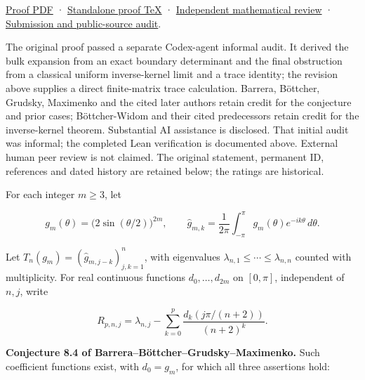 \documentclass[11pt,a4paper]{article}
\makeatletter
\renewcommand{\subsection}{\Needspace{4\baselineskip}\@startsection{subsection}{2}{0pt}{9pt plus 1pt minus 1pt}{3pt}{\sffamily\bfseries\normalsize\color{ink}}}
\makeatother
\begin{document}
\href{https://github.com/ajt60gaibb/OpenProblemsInNLA/blob/main/matrix-functions-and-stability/MF-21/solution.pdf}{Proof
PDF} ·
\href{https://github.com/ajt60gaibb/OpenProblemsInNLA/blob/main/matrix-functions-and-stability/MF-21/solution.tex}{Standalone
proof TeX} ·
\href{https://github.com/ajt60gaibb/OpenProblemsInNLA/blob/main/references/stepaniants-mf21-2026-09-12/independent-review.md}{Independent
mathematical review} ·
\href{https://github.com/ajt60gaibb/OpenProblemsInNLA/blob/main/references/stepaniants-mf21-2026-09-12/README.md}{Submission
and public-source audit}.

The original proof passed a separate Codex-agent informal audit. It
derived the bulk expansion from an exact boundary determinant and the
final obstruction from a classical uniform inverse-kernel limit and a
trace identity; the revision above supplies a direct finite-matrix trace
calculation. Barrera, Böttcher, Grudsky, Maximenko and the cited later
authors retain credit for the conjecture and prior cases; Böttcher-Widom
and their cited predecessors retain credit for the inverse-kernel
theorem. Substantial AI assistance is disclosed. That initial audit was
informal; the completed Lean verification is documented above. External
human peer review is not claimed. The original statement, permanent ID,
references and dated history are retained below; the ratings are
historical.

\hypertarget{statement}{%
\subsection{Statement}\label{statement}}

For each integer \(m\ge3\), let

\[g_m(\theta)=\bigl(2\sin(\theta/2)\bigr)^{2m},\qquad
\widehat g_{m,k}=\frac1{2\pi}\int_{-\pi}^{\pi}g_m(\theta)e^{-ik\theta}\,d\theta.\]

Let \(T_n(g_m)=(\widehat g_{m,j-k})_{j,k=1}^n\), with eigenvalues
\(\lambda_{n,1}\le\cdots\le\lambda_{n,n}\) counted with multiplicity.
For real continuous functions \(d_0,\ldots,d_{2m}\) on \([0,\pi]\),
independent of \(n,j\), write

\[R_{p,n,j}=\lambda_{n,j}-\sum_{k=0}^p
\frac{d_k(j\pi/(n+2))}{(n+2)^k}.\]

\textbf{Conjecture 8.4 of Barrera--Böttcher--Grudsky--Maximenko.} Such
coefficient functions exist, with \(d_0=g_m\), for which all three
assertions hold:
\end{document}
